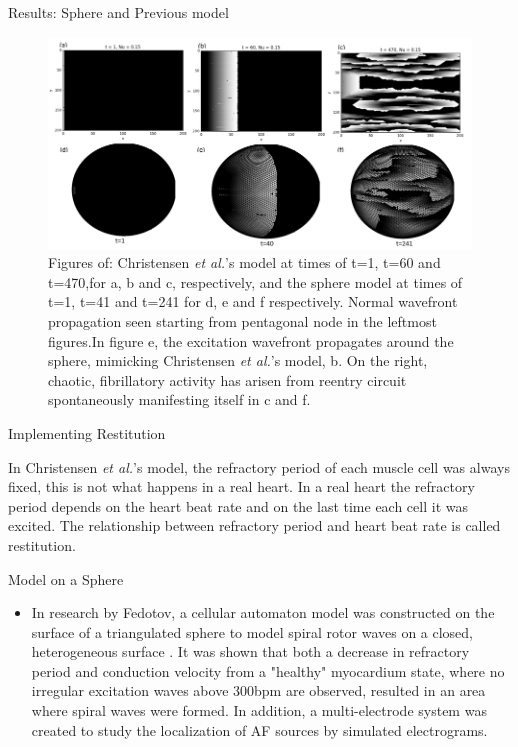 \documentclass[final,hyperref={pdfpagelabels=false}]{beamer}
\begin{document}
\begin{frame}[t]
\begin{columns}[t]
\begin{column}{.465\textwidth}


\begin{block}{Results: Sphere and Previous model}

\begin{figure}
\includegraphics[width=0.8\linewidth]{combchristensenspherefib}
\caption{Figures of: Christensen \emph{et al.}'s model at times of t=1, t=60 and t=470,for a, b and c, respectively, and the sphere model at times of t=1, t=41 and t=241 for d, e and f respectively. Normal wavefront propagation seen starting from pentagonal node in the leftmost figures.In figure e, the excitation wavefront propagates around the sphere, mimicking Christensen \emph{et al.}'s model, b. On the right, chaotic, fibrillatory activity has arisen from reentry circuit spontaneously manifesting itself in c and f.}
\end{figure}

\end{block}


\begin{block}{Implementing Restitution }

In Christensen \emph{et al.}'s model, the refractory period of each muscle cell was always fixed, this is not what happens in a real heart.
In a real heart the refractory period depends on the heart beat rate and on the last time each cell it was excited. The relationship between refractory period and heart beat rate is called restitution.
\end{block}



\begin{block}{Model on a Sphere}


\begin{itemize}
\item In research by Fedotov, a cellular automaton model was constructed on the surface of a triangulated sphere to model spiral rotor waves on a closed, heterogeneous surface \cite{Fedotov}. It was shown that both a decrease in refractory period and conduction velocity from a "healthy" myocardium state, where no irregular excitation waves above 300bpm are observed, resulted in an area where spiral waves were formed. In addition, a multi-electrode system was created to study the localization of AF sources by simulated electrograms. 
\end{itemize}


\end{block}
\end{column}
\end{columns}
\end{frame}
\end{document}
